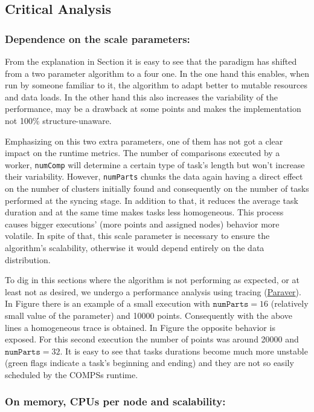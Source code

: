 \documentclass[10pt,journal,compsoc]{IEEEtran}
\begin{document}
\subsection{Critical Analysis} \label{subsec:critical}

\subsubsection{Dependence on the scale parameters:}

From the explanation in Section  it is easy to see that the paradigm has shifted from a two parameter algorithm to a four one. In the one hand this enables, when run by someone familiar to it, the algorithm to adapt better to mutable resources and data loads. In the other hand this also increases the variability of the performance, may be a drawback at some points and makes the implementation not 100\% structure-unaware.

Emphasizing on this two extra parameters, one of them has not got a clear impact on the runtime metrics. The number of comparisons executed by a worker, \texttt{numComp} will determine a certain type of task's length but won't increase their variability. However, \texttt{numParts} chunks the data again having a direct effect on the number of clusters initially found and consequently on the number of tasks performed at the syncing stage. In addition to that, it reduces the average task duration and at the same time makes tasks less homogeneous. This process causes bigger executions' (more points and assigned nodes) behavior more volatile. In spite of that, this scale parameter is necessary to ensure the algorithm's scalability, otherwise it would depend entirely on the data distribution.


To dig in this sections where the algorithm is not performing as expected, or at least not as desired, we undergo a performance analysis using tracing (\href{https://tools.bsc.es/paraver}{Paraver}). In Figure  there is an example of a small execution with  $\texttt{numParts}=16$ (relatively small value of the parameter) and 10000 points. Consequently with the above lines a homogeneous trace is obtained. In Figure  the opposite behavior is exposed. For this second execution the number of points was around 20000 and $\texttt{numParts}=32$. It is easy to see that tasks durations become much more unstable (green flags indicate a task's beginning and ending) and they are not so easily scheduled by the COMPSs runtime.


\subsubsection{On memory, CPUs per node and scalability:} \label{q_coi_passa}
\end{document}
